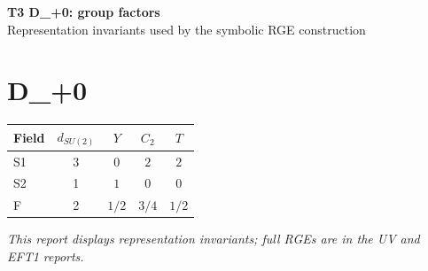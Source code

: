 \documentclass[10pt,a4paper]{article}
\begin{document}
\begin{center}
{\Large\bfseries T3 D\_+0: group factors}\\[4pt]
Representation invariants used by the symbolic RGE construction
\end{center}
\bigskip
\section*{D\_+0}
\begin{longtable}{@{}lcccc@{}}
\toprule Field & $d_{SU(2)}$ & $Y$ & $C_2$ & $T$ \\
\midrule
S1 & 3 & $0$ & $2$ & $2$ \\
S2 & 1 & $1$ & $0$ & $0$ \\
F & 2 & $1/2$ & $3/4$ & $1/2$ \\
\bottomrule
\end{longtable}
\emph{This report displays representation invariants; full RGEs are in the UV and EFT1 reports.}
\end{document}
